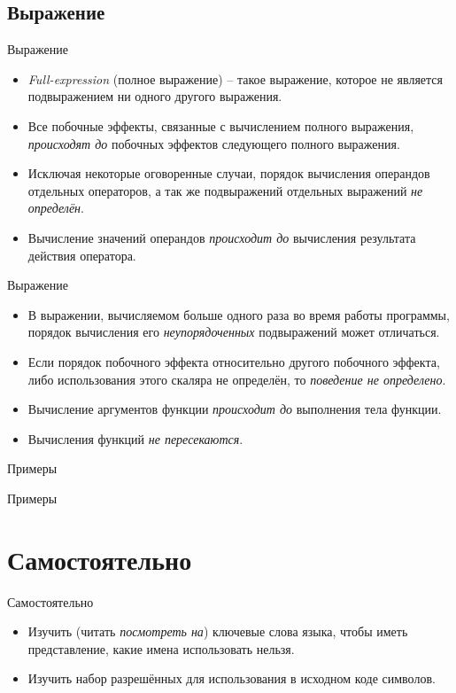     \subsection{Выражение}
    \begin{frame}{Выражение}
        \begin{itemize}
            \item \textit{Full-expression} (полное выражение) -- такое выражение, которое не является подвыражением ни одного другого выражения.
            \item Все побочные эффекты, связанные с вычислением полного выражения, \textit{происходят до} побочных эффектов следующего полного выражения.
            \item Исключая некоторые оговоренные случаи, порядок вычисления операндов отдельных операторов, а так же подвыражений отдельных выражений \textit{не определён}.
            \item Вычисление значений операндов \textit{происходит до} вычисления результата действия оператора.
        \end{itemize}
    \end{frame}
    \begin{frame}{Выражение}
        \begin{itemize}
            \item В выражении, вычисляемом больше одного раза во время работы программы, порядок вычисления его \textit{неупорядоченных} подвыражений может отличаться.
            \item Если порядок побочного эффекта относительно другого побочного эффекта, либо использования этого скаляра не определён, то \textit{поведение не определено}.
            \item Вычисление аргументов функции \textit{происходит до } выполнения тела функции.
            \item Вычисления функций \textit{не пересекаются}.
        \end{itemize}
    \end{frame}
    \begin{frame}{Примеры}
        
    \end{frame}
    \begin{frame}{Примеры}
        
    \end{frame}
    \section{Самостоятельно}
    \begin{frame}{Самостоятельно}
        \begin{itemize}
            \item Изучить (читать \textit{посмотреть на}) ключевые слова языка,
                чтобы иметь представление, какие имена использовать нельзя.
            \item Изучить набор разрешённых для использования в исходном коде символов.
        \end{itemize}
    \end{frame}

